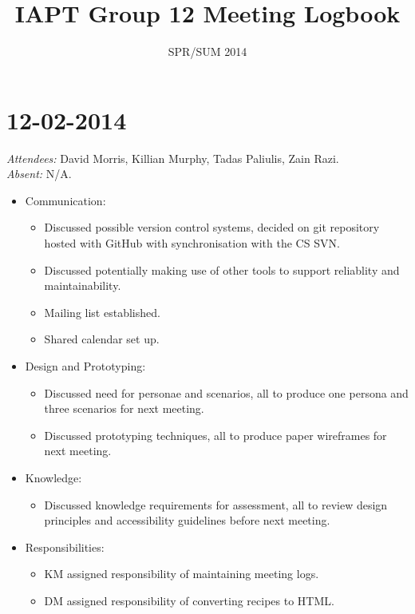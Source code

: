 \documentclass{article}
\title{IAPT Group 12 Meeting Logbook}
\date{SPR/SUM 2014}
\begin{document}
\maketitle
\clearpage

\section*{12-02-2014}
\vspace{.5cm}
\emph{Attendees: }David Morris, Killian Murphy, Tadas Paliulis, Zain Razi.
\\
\emph{Absent: }N/A.

\begin{itemize}
\item Communication: 
  \begin {itemize}
  \item Discussed possible version control systems, decided on git repository hosted with GitHub with synchronisation with the CS SVN. 
  \item Discussed potentially making use of other tools to support reliablity and maintainability.
  \item Mailing list established.
  \item Shared calendar set up.
  \end{itemize}
\item Design and Prototyping:
  \begin{itemize}
  \item Discussed need for personae and scenarios, all to produce one persona and three scenarios for next meeting.
  \item Discussed prototyping techniques, all to produce paper wireframes for next meeting.
  \end{itemize}
\item Knowledge:
  \begin{itemize}
  \item Discussed knowledge requirements for assessment, all to review design principles and accessibility guidelines before next meeting.
  \end{itemize}
\item Responsibilities:
  \begin{itemize}
  \item KM assigned responsibility of maintaining meeting logs.
  \item DM assigned responsibility of converting recipes to HTML.
  \end{itemize}
\end{itemize}
\end{document}
